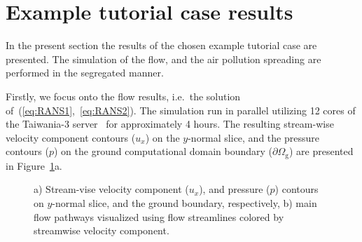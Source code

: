 \cleardoublepage
\section{Example tutorial case results}
\label{sec:exp}

In the present section the results of the chosen example tutorial case are presented. The simulation of the flow, and the air pollution spreading are performed in the segregated manner. 

Firstly, we focus onto the flow results, i.e.\ the solution of~(\ref{eq:RANS1},~\ref{eq:RANS2}). The simulation run in parallel utilizing 12 cores of the Taiwania-3 server~\cite{tw3} for approximately 4 hours.  The resulting stream-wise velocity component contours ($u_x$) on the $y$-normal slice, and the pressure contours ($p$) on the ground computational domain boundary ($\partial\Omega_{\mathrm{g}}$) are presented in Figure~\ref{fig:ux_p}a. 

\begin{figure}[htpb]
    
    \caption{a) Stream-vise velocity component ($u_x$), and pressure ($p$) contours on $y$-normal slice, and the ground boundary, respectively, b) main flow pathways visualized using flow streamlines colored by streamwise velocity component.}
    \label{fig:ux_p}
\end{figure}

